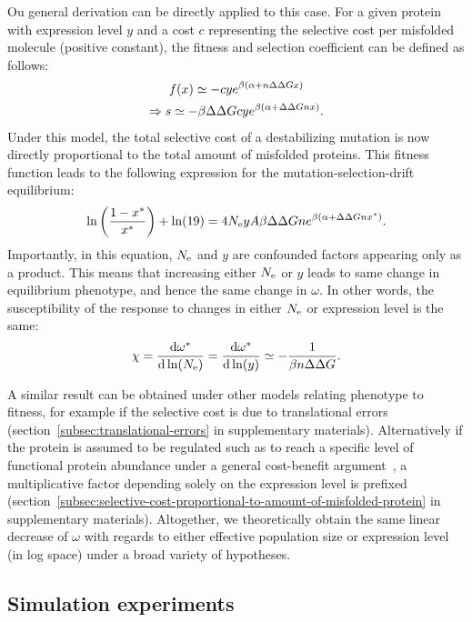 Ou general derivation can be directly applied to this case.
For a given protein with expression level $y$ and a cost $c$ representing the selective cost per misfolded molecule (positive constant), the fitness and selection coefficient can be defined as follows:
\begin{gather}
    f (x) \simeq - c y e^{\beta (\alpha + n \Delta \Delta G x)} \\
    \Rightarrow s \simeq - \beta \Delta \Delta G c y e^{\beta(\alpha + \Delta \Delta G n x)}.
\end{gather}
Under this model, the total selective cost of a destabilizing mutation is now directly proportional to the total amount of misfolded proteins.
This fitness function leads to the following expression for the mutation-selection-drift equilibrium:
\begin{equation}
    \ln \left( \frac{1 - x^{*}}{x^{*}} \right) + \ln (19) = 4N_{\text{e}} y A \beta \Delta \Delta G n e^{\beta(\alpha + \Delta \Delta G n x^{*})}.
\end{equation}
Importantly, in this equation, $N_{\text{e}}$ and $y$ are confounded factors appearing only as a product.
This means that increasing either $N_{\text{e}}$ or $y$ leads to same change in equilibrium phenotype, and hence the same change in $\omega$.
In other words, the susceptibility of the response to changes in either $N_{\text{e}}$ or expression level is the same:
\begin{align}
    \chi = \frac{ \der \omega\eq}{\der \ln (\Ne)} = \frac{ \der \omega\eq}{\der \ln (y)} \simeq - \frac{1}{\beta \NbrSites \DeltaDeltaG}. \label{eq:chi_application_y}
\end{align}

A similar result can be obtained under other models relating phenotype to fitness, for example if the selective cost is due to translational errors (section~\ref{subsec:translational-errors} in supplementary materials).
Alternatively if the protein is assumed to be regulated such as to reach a specific level of functional protein abundance under a general cost-benefit argument~\citep{Cherry2010,Gout2010}, a multiplicative factor depending solely on the expression level is prefixed (section~\ref{subsec:selective-cost-proportional-to-amount-of-misfolded-protein} in supplementary materials).
Altogether, we theoretically obtain the same linear decrease of $\omega$ with regards to either effective population size or expression level (in log space) under a broad variety of hypotheses.

\subsection{Simulation experiments}

